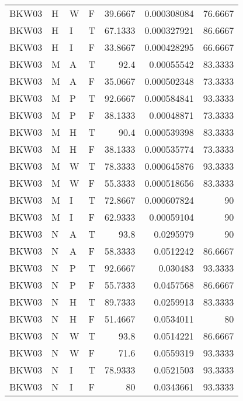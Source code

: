 \begin{table}[!htb]
{\begin{tabular}{llllrrr}
            BKW03    & H     & W     & F          & 39.6667    & 0.000308084 & 76.6667  \\
            BKW03    & H     & I     & T          & 67.1333    & 0.000327921 & 86.6667  \\
            BKW03    & H     & I     & F          & 33.8667    & 0.000428295 & 66.6667  \\
            BKW03    & M     & A     & T          & 92.4       & 0.00055542  & 83.3333  \\
            BKW03    & M     & A     & F          & 35.0667    & 0.000502348 & 73.3333  \\
            BKW03    & M     & P     & T          & 92.6667    & 0.000584841 & 93.3333  \\
            BKW03    & M     & P     & F          & 38.1333    & 0.00048871  & 73.3333  \\
            BKW03    & M     & H     & T          & 90.4       & 0.000539398 & 83.3333  \\
            BKW03    & M     & H     & F          & 38.1333    & 0.000535774 & 73.3333  \\
            BKW03    & M     & W     & T          & 78.3333    & 0.000645876 & 93.3333  \\
            BKW03    & M     & W     & F          & 55.3333    & 0.000518656 & 83.3333  \\
            BKW03    & M     & I     & T          & 72.8667    & 0.000607824 & 90       \\
            BKW03    & M     & I     & F          & 62.9333    & 0.00059104  & 90       \\
            BKW03    & N     & A     & T          & 93.8       & 0.0295979   & 90       \\
            BKW03    & N     & A     & F          & 58.3333    & 0.0512242   & 86.6667  \\
            BKW03    & N     & P     & T          & 92.6667    & 0.030483    & 93.3333  \\
            BKW03    & N     & P     & F          & 55.7333    & 0.0457568   & 86.6667  \\
            BKW03    & N     & H     & T          & 89.7333    & 0.0259913   & 83.3333  \\
            BKW03    & N     & H     & F          & 51.4667    & 0.0534011   & 80       \\
            BKW03    & N     & W     & T          & 93.8       & 0.0514221   & 86.6667  \\
            BKW03    & N     & W     & F          & 71.6       & 0.0559319   & 93.3333  \\
            BKW03    & N     & I     & T          & 78.9333    & 0.0521503   & 93.3333  \\
            BKW03    & N     & I     & F          & 80         & 0.0343661   & 93.3333  \\
            \hline
        \end{tabular}
    }{}
\end{table}